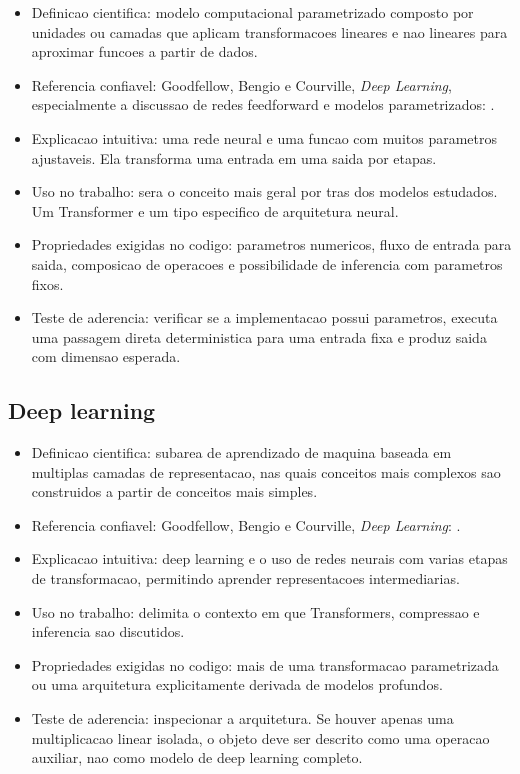\begin{itemize}
\item Definicao cientifica: modelo computacional parametrizado composto por
unidades ou camadas que aplicam transformacoes lineares e nao lineares para
aproximar funcoes a partir de dados.
\item Referencia confiavel: Goodfellow, Bengio e Courville, \emph{Deep Learning},
especialmente a discussao de redes feedforward e modelos parametrizados:
.
\item Explicacao intuitiva: uma rede neural e uma funcao com muitos parametros
ajustaveis. Ela transforma uma entrada em uma saida por etapas.
\item Uso no trabalho: sera o conceito mais geral por tras dos modelos estudados.
Um Transformer e um tipo especifico de arquitetura neural.
\item Propriedades exigidas no codigo: parametros numericos, fluxo de entrada para
saida, composicao de operacoes e possibilidade de inferencia com parametros
fixos.
\item Teste de aderencia: verificar se a implementacao possui parametros, executa
uma passagem direta deterministica para uma entrada fixa e produz saida com
dimensao esperada.
\end{itemize}


\subsection{Deep learning}


\begin{itemize}
\item Definicao cientifica: subarea de aprendizado de maquina baseada em multiplas
camadas de representacao, nas quais conceitos mais complexos sao construidos a
partir de conceitos mais simples.
\item Referencia confiavel: Goodfellow, Bengio e Courville, \emph{Deep Learning}:
.
\item Explicacao intuitiva: deep learning e o uso de redes neurais com varias
etapas de transformacao, permitindo aprender representacoes intermediarias.
\item Uso no trabalho: delimita o contexto em que Transformers, compressao e
inferencia sao discutidos.
\item Propriedades exigidas no codigo: mais de uma transformacao parametrizada ou
uma arquitetura explicitamente derivada de modelos profundos.
\item Teste de aderencia: inspecionar a arquitetura. Se houver apenas uma
multiplicacao linear isolada, o objeto deve ser descrito como uma operacao
auxiliar, nao como modelo de deep learning completo.
\end{itemize}


